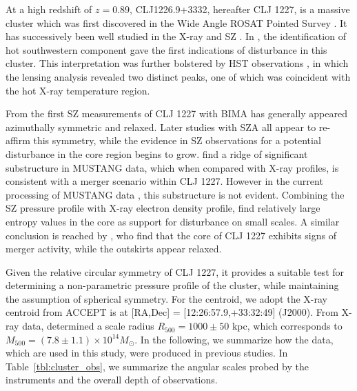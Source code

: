 \documentclass[twocolumn,traditabstract]{aa}
\begin{document}


At a high redshift of $z=0.89$, CLJ1226.9+3332, hereafter CLJ 1227, is a massive cluster which was first discovered in the
Wide Angle ROSAT Pointed Survey \citep[WARPS][]{ebeling2001}. It has successively been well studied in the X-ray
\citep[\emph{XMM},\emph{Chandra}, and \emph{XMM/Chandra}][respectively]{maughan2004,bonamente2006,maughan2007}
and SZ \citep[][]{joy2001,muchovej2007,mroczkowski2009,mroczkowski2011,bulbul2010,korngut2011,adam2015}.
In \citet{maughan2007}, the identification of hot southwestern component gave the first indications of disturbance
in this cluster. This interpretation was further bolstered by HST observations \citep{jee2009a}, in which the lensing
analysis revealed two distinct peaks, one of which was coincident with the hot X-ray temperature region.

From the first SZ measurements of CLJ 1227 with BIMA \citep[][]{joy2001} has generally appeared
azimuthally symmetric and relaxed. Later studies with SZA \citep{muchovej2007,mroczkowski2009,mroczkowski2011}
all appear to re-affirm this symmetry, while the evidence in SZ observations for a potential disturbance
in the core region begins to grow. \citet{korngut2011} find a ridge of significant substructure in
MUSTANG data, which when compared with X-ray profiles, is consistent with a merger scenario within
CLJ 1227. However in the current processing of MUSTANG data \citep{romero2017},
this substructure is not evident. Combining the SZ pressure profile with X-ray electron density profile,
\citet{adam2015} find relatively large entropy values in the core as support for disturbance on small scales.
A similar conclusion is reached by \citet{rumsey2016}, who find that the core
of CLJ 1227 exhibits signs of merger activity, while the outskirts appear relaxed.

Given the relative circular symmetry of CLJ 1227, it provides a suitable test for determining a non-parametric pressure
profile of the cluster, while maintaining the assumption of spherical symmetry. For the centroid, we adopt the X-ray
centroid from ACCEPT \citep{cavagnolo2009} is at [RA,Dec] = [12:26:57.9,+33:32:49] (J2000).
From X-ray data, \citet{mantz2010b} determined a scale radius $R_{500} = 1000 \pm 50$ kpc, which corresponds to
$M_{500} = (7.8 \pm 1.1) \times 10^{14} M_{\odot}$. In the following, we summarize how the data, which are used in this study,
were produced in previous studies. In Table~\ref{tbl:cluster_obs}, we summarize the angular scales probed by the instruments
and the overall depth of observations.
\end{document}
